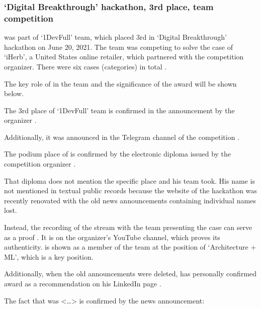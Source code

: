 \subsubsection{`Digital Breakthrough' hackathon, 3rd place, team competition}
\label{subsubsec:AwardLod}


\mrl was part of `1DevFull' team, which placed 3rd in `Digital Breakthrough' hackathon
on June 20, 2021.
The team was competing to solve the case of `iHerb', a United States online retailer,
which partnered with the competition organizer.
There were six cases (categories) in total .

The key role of \mrl in the team and the significance of the award will be shown below.



The 3rd place of `1DevFull' team is confirmed in the announcement by the organizer .

Additionally, it was announced in the Telegram channel of the competition .



The podium place of \mrl is confirmed by the electronic diploma
issued by the competition organizer .

That diploma does not mention the specific place \mrl and his team took.
His name is not mentioned in textual public records because the website of the hackathon
was recently renovated with the old news announcements containing individual names lost.

Instead, the recording of the stream with the team presenting the case
can serve as a proof .
It is on the organizer's YouTube channel, which proves its authenticity.
\mrl is shown as a member of the team at the position of `Architecture + ML',
which is a key position.

Additionally, when the old announcements were deleted,
\MrLod
has personally confirmed \mrls award as a recommendation
on his LinkedIn page .

The fact that \MrLod was <\dots> is confirmed by
the news announcement:




